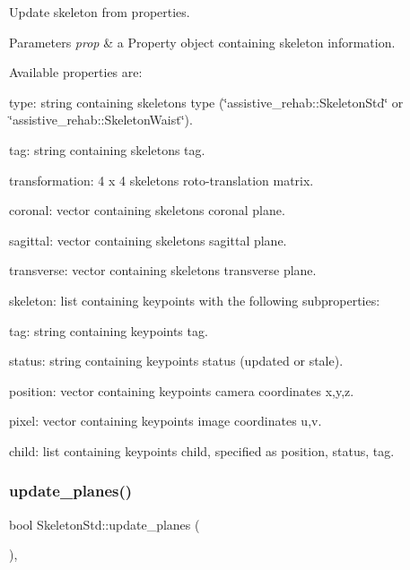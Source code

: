 Update skeleton from properties. 


\begin{DoxyParams}{Parameters}
{\em prop} & a Property object containing skeleton information.\\
\hline
\end{DoxyParams}
Available properties are\+:
\begin{DoxyItemize}
\item type\+: string containing skeleton\textquotesingle{}s type (\char`\"{}assistive\+\_\+rehab\+::\+Skeleton\+Std\char`\"{} or \char`\"{}assistive\+\_\+rehab\+::\+Skeleton\+Waist\char`\"{}).
\item tag\+: string containing skeleton\textquotesingle{}s tag.
\item transformation\+: 4 x 4 skeleton\textquotesingle{}s roto-\/translation matrix.
\item coronal\+: vector containing skeleton\textquotesingle{}s coronal plane.
\item sagittal\+: vector containing skeleton\textquotesingle{}s sagittal plane.
\item transverse\+: vector containing skeleton\textquotesingle{}s transverse plane.
\item skeleton\+: list containing keypoints with the following subproperties\+:
\begin{DoxyItemize}
\item tag\+: string containing keypoint\textquotesingle{}s tag.
\item status\+: string containing keypoint\textquotesingle{}s status (updated or stale).
\item position\+: vector containing keypoint\textquotesingle{}s camera coordinates x,y,z.
\item pixel\+: vector containing keypoint\textquotesingle{}s image coordinates u,v.
\item child\+: list containing keypoint\textquotesingle{}s child, specified as position, status, tag. 
\end{DoxyItemize}
\end{DoxyItemize}\mbox{\label{classassistive__rehab_1_1SkeletonStd_a5769bc6fd407118c866b57b869d672ca}} 
\subsubsection{\texorpdfstring{update\_planes()}{update\_planes()}}
{\footnotesize\ttfamily bool Skeleton\+Std\+::update\+\_\+planes (\begin{DoxyParamCaption}{ }\end{DoxyParamCaption})\hspace{0.3cm}{\ttfamily [override]}, {\ttfamily [virtual]}}



